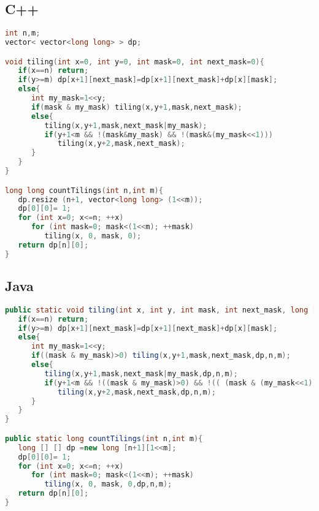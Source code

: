 \subsection{C++}
\begin{lstlisting}[language=C++]
int n,m;
vector< vector<long long> > dp;

void tiling(int x=0, int y=0, int mask=0, int next_mask=0){
   if(x==n) return;
   if(y>=m) dp[x+1][next_mask]=dp[x+1][next_mask]+dp[x][mask];
   else{
      int my_mask=1<<y;
      if(mask & my_mask) tiling(x,y+1,mask,next_mask);
      else{
         tiling(x,y+1,mask,next_mask|my_mask);
         if(y+1<m && !(mask&my_mask) && !(mask&(my_mask<<1)))
         	tiling(x,y+2,mask,next_mask);
      }
   }
}

long long countTilings(int n,int m){
   dp.resize (n+1, vector<long long> (1<<m));
   dp[0][0]= 1;
   for (int x=0; x<=n; ++x)
      for (int mask=0; mask<(1<<m); ++mask)
         tiling(x, 0, mask, 0);
   return dp[n][0];
}
\end{lstlisting}
\subsection{Java}
\begin{lstlisting}[language=Java]
public static void tiling(int x, int y, int mask, int next_mask, long [] [] dp,int n,int m){
   if(x==n) return;
   if(y>=m) dp[x+1][next_mask]=dp[x+1][next_mask]+dp[x][mask];
   else{
      int my_mask=1<<y;
      if((mask & my_mask)>0) tiling(x,y+1,mask,next_mask,dp,n,m);
      else{
         tiling(x,y+1,mask,next_mask|my_mask,dp,n,m);
         if(y+1<m && !((mask & my_mask)>0) && !(( (mask & (my_mask<<1)) >0)))
            tiling(x,y+2,mask,next_mask,dp,n,m);
      }
   }
}

public static long countTilings(int n,int m){
   long [] [] dp =new long [n+1][1<<m];
   dp[0][0]= 1;
   for (int x=0; x<=n; ++x)
      for (int mask=0; mask<(1<<m); ++mask)
         tiling(x, 0, mask, 0,dp,n,m);
   return dp[n][0];
}
\end{lstlisting}